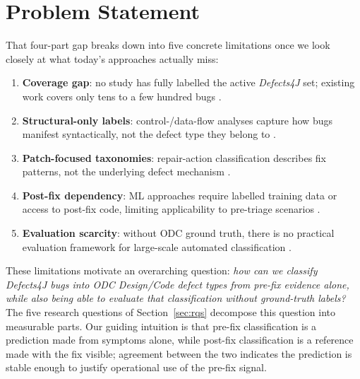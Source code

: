 \section{Problem Statement}
\label{sec:problem}

That four-part gap breaks down into five concrete limitations once we look
closely at what today's approaches actually miss:

\begin{enumerate}
  \item \textbf{Coverage gap}: no study has fully labelled the active
        \textit{Defects4J} set; existing work covers only tens to a few hundred
        bugs \citep{xuan2017better,vanderspuy2025anatomy,sobreira2018dissection}.
  \item \textbf{Structural-only labels}: control-/data-flow analyses capture
        how bugs manifest syntactically, not the defect type they belong to
        \citep{vanderspuy2025anatomy}.
  \item \textbf{Patch-focused taxonomies}: repair-action classification
        describes fix patterns, not the underlying defect mechanism
        \citep{sobreira2018dissection}.
  \item \textbf{Post-fix dependency}: ML approaches require labelled training
        data or access to post-fix code, limiting applicability to pre-triage
        scenarios \citep{thung2012automatic}.
  \item \textbf{Evaluation scarcity}: without ODC ground truth, there is no
        practical evaluation framework for large-scale automated classification
        \citep{andrade2025empirical}.
\end{enumerate}

These limitations motivate an overarching question: \emph{how can we classify
\textit{Defects4J} bugs into ODC Design/Code defect types from pre-fix evidence
alone, while also being able to evaluate that classification without
ground-truth labels?} The five research questions of
Section~\ref{sec:rqs} decompose this question into measurable parts. Our
guiding intuition is that pre-fix classification is a prediction made from
symptoms alone, while post-fix classification is a reference made with the fix
visible; agreement between the two indicates the prediction is stable enough to
justify operational use of the pre-fix signal.

